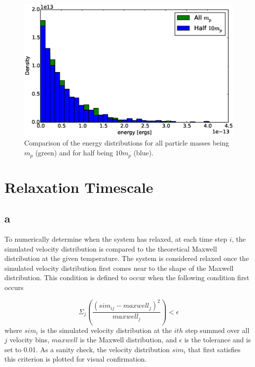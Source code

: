 \documentclass[12pt]{amsart}
\begin{document}
\begin{figure}[h!]
  \centering
    \includegraphics[width=1.0\textwidth]{energy_comp.eps}
    \caption{Comparison of the energy distributions for all particle masses being $m_p$ (green) and for half being $10m_p$ (blue).}
\end{figure}


\section{Relaxation Timescale}

\subsection{a}

To numerically determine when the system has relaxed, at each time step $i$, the simulated velocity distribution is compared to the theoretical Maxwell distribution at the given temperature.  The system is considered relaxed once the simulated velocity distribution first comes near to the shape of the Maxwell distribution.  This condition is defined to occur when the following condition first occurs

$$ \Sigma_j(\frac{(sim_{ij} - maxwell_j)^2}{maxwell_j}) < \epsilon$$
\newline
where $sim_i$ is the simulated velocity distribution at the $ith$ step summed over all $j$ velocity bins, $maxwell$ is the Maxwell distribution, and $\epsilon$ is the tolerance and is set to 0.01.  As a sanity check, the velocity distribution $sim_i$ that first satisfies this criterion is plotted for visual confirmation.  
\end{document}
